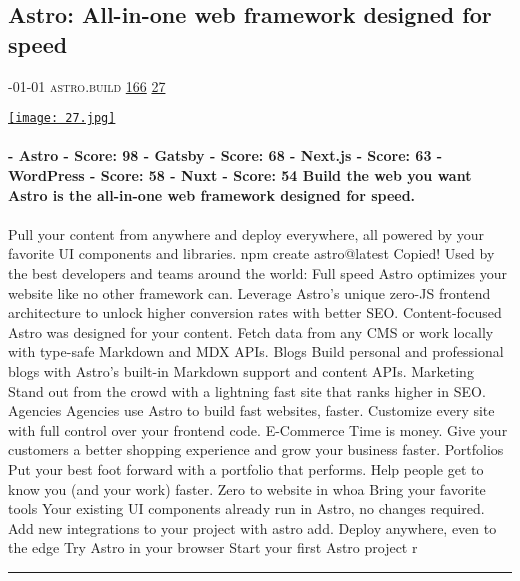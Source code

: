 \documentclass[10pt,a4paper]{article}
\begin{document}
\begin{multicols}{2}
\begin{minipage}{\linewidth}
\subsection{Astro: All-in-one web framework designed for speed}
\textsc{\footnotesize
{\scriptsize\faCalendar}-01-01 
{\scriptsize\faGlobe}\space 
astro.build 
{\scriptsize\faThumbsOUp}\space 
\href{http://news.ycombinator.com/item?id=37108111\&utm\_term=comment}{166} 
{\scriptsize\faComments}\space 
\href{http://news.ycombinator.com/item?id=37108111\&utm\_term=comment}{27} 
}
\par\medskip\noindent
\href{https://astro.build/?utm\_source=hackernewsletter\&utm\_medium=email\&utm\_term=code}{
    \texttt{[image: 27.jpg]}
}
\end{minipage}
\paragraph{}
\textbf{- Astro
-
Score: 98
- Gatsby
-
Score: 68
- Next.js
-
Score: 63
- WordPress
-
Score: 58
- Nuxt
-
Score: 54
Build the web
you want
Astro is the all-in-one web framework designed for speed.}
\paragraph{}
 Pull your content from anywhere and deploy everywhere, all powered by your favorite UI components and libraries.
npm create astro@latest
Copied!
Used by the best developers and teams around the world:
Full speed
Astro optimizes your website like no other framework can. Leverage Astro's unique zero-JS frontend architecture to unlock higher conversion rates with better SEO.
Content-focused
Astro was designed for your content. Fetch data from any CMS or work locally with type-safe Markdown and MDX APIs.
Blogs
Build personal and professional blogs with Astro's built-in Markdown support and content APIs.
Marketing
Stand out from the crowd with a lightning fast site that ranks higher in SEO.
Agencies
Agencies use Astro to build fast websites, faster. Customize every site with full control over your frontend code.
E-Commerce
Time is money. Give your customers a better shopping experience and grow your business faster.
Portfolios
Put your best foot forward with a portfolio that performs. Help people get to know you (and your work) faster.
Zero to website in whoa
Bring your
favorite tools
Your existing UI components already run in Astro, no changes required. Add new
integrations to your project with
astro add.
Deploy anywhere, even to the edge
Try Astro in your browser
Start your first Astro project r
\par\noindent\textcolor{red}{\rule{\linewidth}{0.2mm}}
\vfill
\null
\noindent\begin{minipage}{\linewidth}

\end{minipage}
\end{multicols}
\end{document}
